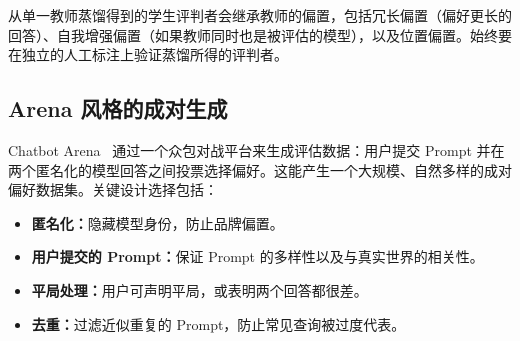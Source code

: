 \begin{warningbox}[蒸馏带来的偏置]
从单一教师蒸馏得到的学生评判者会继承教师的偏置，包括冗长偏置（偏好更长的回答）、自我增强偏置（如果教师同时也是被评估的模型），以及位置偏置。始终要在独立的人工标注上验证蒸馏所得的评判者。
\end{warningbox}

\subsection{Arena 风格的成对生成}
\label{arena-style-pairwise-generation}

Chatbot Arena~\cite{zheng2023judging} 通过一个众包对战平台来生成评估数据：用户提交 Prompt 并在两个匿名化的模型回答之间投票选择偏好。这能产生一个大规模、自然多样的成对偏好数据集。关键设计选择包括：

\begin{itemize}
  \item \textbf{匿名化：}隐藏模型身份，防止品牌偏置。
  \item \textbf{用户提交的 Prompt：}保证 Prompt 的多样性以及与真实世界的相关性。
  \item \textbf{平局处理：}用户可声明平局，或表明两个回答都很差。
  \item \textbf{去重：}过滤近似重复的 Prompt，防止常见查询被过度代表。
\end{itemize}

